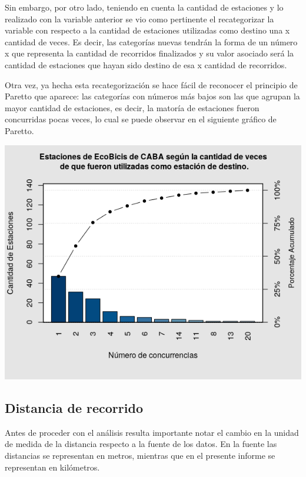 \documentclass[11pt]{article}
\begin{document}
    Sin embargo, por otro lado, teniendo en cuenta la cantidad de estaciones y lo realizado con la variable anterior se vio como pertinente el recategorizar la variable 
    con respecto a la cantidad de estaciones utilizadas como destino una x cantidad de veces. Es decir, 
    las categor\'ias nuevas tendr\'an la forma de un n\'umero x que representa la cantidad de recorridos finalizados y su valor
    asociado ser\'a la cantidad de estaciones que hayan sido destino de esa x cantidad de recorridos. 

    Otra vez, ya hecha esta recategorizaci\'on se hace f\'acil de reconocer el principio de Paretto que aparece: las categor\'ias con n\'umeros m\'as bajos son las que 
    agrupan la mayor cantidad de estaciones, es decir, la mator\'ia de estaciones fueron concurridas pocas veces, lo cual se puede observar en el siguiente gr\'afico de Paretto. 

    \begin{center}
      \includegraphics[scale=0.7]{ParettoDest.png}
    \end{center}

    \subsection{Distancia de recorrido}

    Antes de proceder con el an\'alisis resulta importante notar el cambio en la unidad 
    de medida de la distancia respecto a la fuente de los datos. En la fuente las distancias 
    se representan en metros, mientras que en el presente informe se representan en kil\'ometros. 
\end{document}
